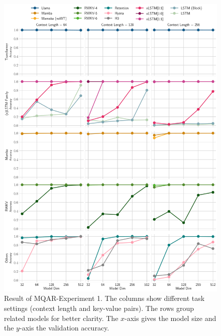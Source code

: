 \documentclass[dvipsnames]{article}
\begin{document}
\begin{appendix}
\begin{figure}[htp]
    \centering
    \includegraphics[width=\textwidth]{figures/MQAR_Appendix_Small.pdf}
    \caption{Result of MQAR-Experiment 1. The columns show different task settings (context length and key-value pairs). The rows group related models for better clarity. The $x$-axis gives the model size and 
    the $y$-axis the validation accuracy.}
    \label{fig:mqar-app-small}
\end{figure}


\end{appendix}
\end{document}
